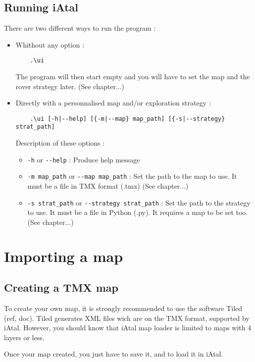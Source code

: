 \documentclass[a4paper,11pt]{article}
\begin{document}
  \subsection{Running iAtal}
    There are two different ways to run the program :
    \begin{itemize}
      \item Whithout any option : 
      \begin{verbatim}
	.\ui
      \end{verbatim}
      The program will then start empty and you will have to set the map and the rover strategy later. (See chapter...)
      
      \item Directly with a personnalised map and/or exploration strategy :
      \begin{verbatim}
	.\ui [-h|--help] [{-m|--map} map_path] [{-s|--strategy} strat_path]
      \end{verbatim}
      Description of these options :
      \begin{itemize}
	\item \verb!-h! or \verb!--help! : Produce help message
	\item \verb!-m map_path! or \verb!--map map_path! : Set the path to the map to use. It must be a file in TMX format
	(.tmx) (See chapter...)
	\item \verb!-s strat_path! or \verb!--strategy strat_path! : Set the path to the strategy to use. It must be a file
	in Python (.py). It requires a map to be set too. (See chapter...)
      \end{itemize}
    \end{itemize}

\section{Importing a map}

  \subsection{Creating a TMX map}
    To create your own map, it is strongly recommended to use the software Tiled (ref, doc).
    Tiled generates XML files wich are on the TMX format, supported by iAtal. However, you should know that iAtal map loader
    is limited to maps with 4 layers or less.
    
    Once your map created, you just have to save it, and to load it in iAtal.
\end{document}
